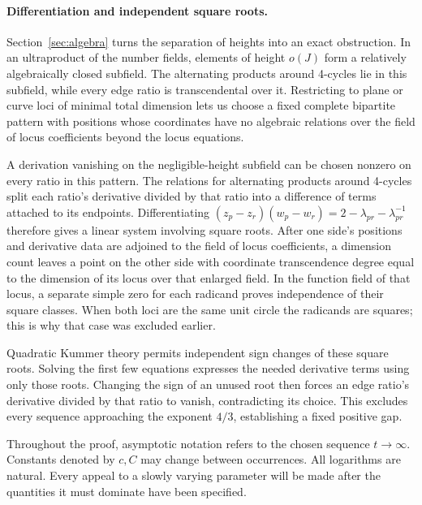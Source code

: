 \paragraph{Differentiation and independent square roots.}
Section~\ref{sec:algebra} turns the separation of heights into an
exact obstruction. In an ultraproduct of the number fields, elements
of height \(o(J)\) form a relatively algebraically closed subfield.
The alternating products around 4-cycles lie in this subfield, while every edge ratio
is transcendental over it. Restricting to plane or curve loci of
minimal total dimension lets us choose a fixed complete bipartite
pattern with positions whose coordinates have no algebraic relations over the field of locus coefficients beyond the locus equations.

A derivation vanishing on the negligible-height subfield can be chosen
nonzero on every ratio in this pattern. The relations for alternating products around 4-cycles split
each ratio's derivative divided by that ratio into a difference of terms
attached to its endpoints. Differentiating
\((z_p-z_r)(w_p-w_r)=2-\lambda_{pr}-\lambda_{pr}^{-1}\) therefore
gives a linear system involving square roots. After one side's
positions and derivative data are adjoined to the field of locus
coefficients, a dimension count leaves a point on the other side
with coordinate transcendence degree equal to the dimension of its locus over that enlarged field. In the function field of that locus, a separate
simple zero for each radicand proves independence of their square
classes. When both loci are the same unit circle the radicands are
squares; this is why that case was excluded earlier.

Quadratic Kummer theory permits independent sign changes of these
square roots. Solving the first few equations expresses the needed
derivative terms using only those roots. Changing the sign of an unused
root then forces an edge ratio's derivative divided by that ratio to vanish,
contradicting its choice. This excludes every sequence approaching the
exponent \(4/3\), establishing a fixed positive gap.

Throughout the proof, asymptotic notation refers to the chosen sequence
\(t\to\infty\). Constants denoted by \(c,C\) may change between occurrences.
All logarithms are natural. Every appeal to a slowly varying parameter
will be made after the quantities it must dominate have been specified.
